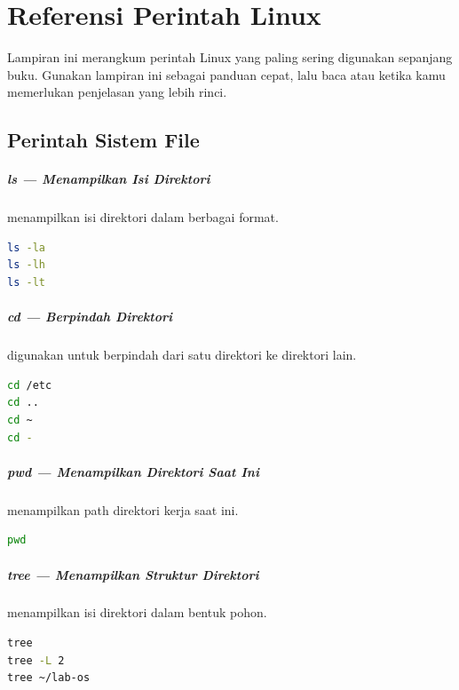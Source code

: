 
\chapter{Referensi Perintah Linux}
\label{app:command-reference}

Lampiran ini merangkum perintah Linux yang paling sering digunakan sepanjang buku.
Gunakan lampiran ini sebagai panduan cepat, lalu baca 
atau  ketika kamu memerlukan penjelasan yang lebih rinci.

\section{Perintah Sistem File}

\paragraph*{ls --- Menampilkan Isi Direktori}
 menampilkan isi direktori dalam berbagai format.
\begin{lstlisting}[language=bash]
ls -la
ls -lh
ls -lt
\end{lstlisting}

\paragraph*{cd --- Berpindah Direktori}
 digunakan untuk berpindah dari satu direktori ke direktori lain.
\begin{lstlisting}[language=bash]
cd /etc
cd ..
cd ~
cd -
\end{lstlisting}

\paragraph*{pwd --- Menampilkan Direktori Saat Ini}
 menampilkan path direktori kerja saat ini.
\begin{lstlisting}[language=bash]
pwd
\end{lstlisting}

\paragraph*{tree --- Menampilkan Struktur Direktori}
 menampilkan isi direktori dalam bentuk pohon.
\begin{lstlisting}[language=bash]
tree
tree -L 2
tree ~/lab-os
\end{lstlisting}

